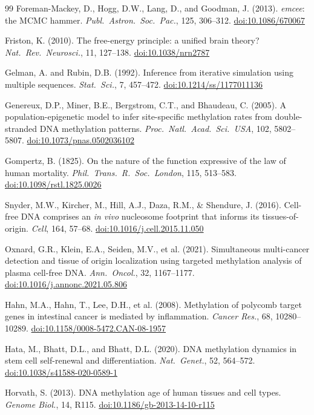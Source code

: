 \documentclass[12pt,a4paper]{article}
\newcommand{\doi}[1]{\href{https://doi.org/#1}{doi:#1}}
\begin{document}
\begin{thebibliography}{99}
Foreman-Mackey, D., Hogg, D.W., Lang, D., and Goodman, J. (2013).
\textit{emcee}: the MCMC hammer.
\textit{Publ.\ Astron.\ Soc.\ Pac.}, 125, 306--312.
\doi{10.1086/670067}

Friston, K. (2010).
The free-energy principle: a unified brain theory?
\textit{Nat.\ Rev.\ Neurosci.}, 11, 127--138.
\doi{10.1038/nrn2787}

Gelman, A. and Rubin, D.B. (1992).
Inference from iterative simulation using multiple sequences.
\textit{Stat.\ Sci.}, 7, 457--472.
\doi{10.1214/ss/1177011136}

Genereux, D.P., Miner, B.E., Bergstrom, C.T., and Bhaudeau, C. (2005).
A population-epigenetic model to infer site-specific methylation rates from double-stranded DNA methylation patterns.
\textit{Proc.\ Natl.\ Acad.\ Sci.\ USA}, 102, 5802--5807.
\doi{10.1073/pnas.0502036102}

Gompertz, B. (1825).
On the nature of the function expressive of the law of human mortality.
\textit{Phil.\ Trans.\ R.\ Soc.\ London}, 115, 513--583.
\doi{10.1098/rstl.1825.0026}

Snyder, M.W., Kircher, M., Hill, A.J., Daza, R.M., \& Shendure, J. (2016).
Cell-free DNA comprises an \textit{in vivo} nucleosome footprint that informs its tissues-of-origin.
\textit{Cell}, 164, 57--68.
\doi{10.1016/j.cell.2015.11.050}

Oxnard, G.R., Klein, E.A., Seiden, M.V., et al. (2021).
Simultaneous multi-cancer detection and tissue of origin localization using targeted methylation analysis of plasma cell-free DNA.
\textit{Ann.\ Oncol.}, 32, 1167--1177.
\doi{10.1016/j.annonc.2021.05.806}

Hahn, M.A., Hahn, T., Lee, D.H., et al. (2008).
Methylation of polycomb target genes in intestinal cancer is mediated by inflammation.
\textit{Cancer Res.}, 68, 10280--10289.
\doi{10.1158/0008-5472.CAN-08-1957}

Hata, M., Bhatt, D.L., and Bhatt, D.L. (2020).
DNA methylation dynamics in stem cell self-renewal and differentiation.
\textit{Nat.\ Genet.}, 52, 564--572.
\doi{10.1038/s41588-020-0589-1}

Horvath, S. (2013).
DNA methylation age of human tissues and cell types.
\textit{Genome Biol.}, 14, R115.
\doi{10.1186/gb-2013-14-10-r115}


\end{thebibliography}
\end{document}
